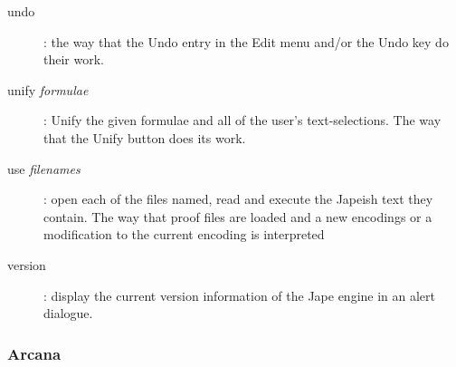 \begin{description}
\item[undo]: the way that the Undo entry in the Edit menu and/or the Undo key do their work.


\item[unify \textit{formulae}]: Unify the given formulae and all of the user's text-selections. The way that the Unify button does its work.


\item[use \textit{filenames}]: open each of the files named, read and execute the Japeish text they contain. The way that proof files are loaded and a new encodings or a modification to the current encoding is interpreted


\item[version]: display the current version information of the Jape engine in an alert dialogue.

\end{description}

\subsubsection{Arcana}


